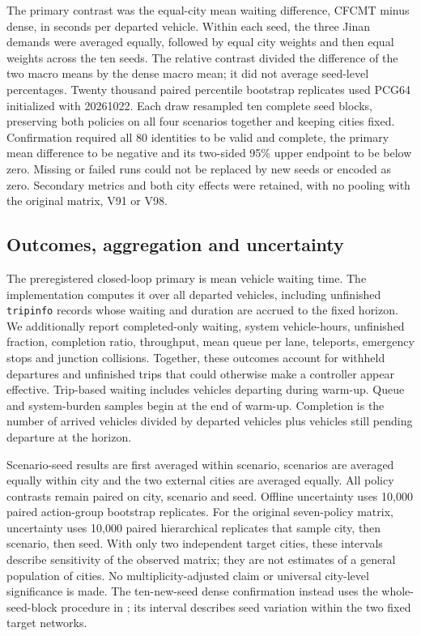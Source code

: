 The primary contrast was the equal-city mean waiting difference, CFCMT minus
dense, in seconds per departed vehicle.  Within each seed, the three Jinan
demands were averaged equally, followed by equal city weights and then equal
weights across the ten seeds.  The relative contrast divided the difference
of the two macro means by the dense macro mean; it did not average seed-level
percentages.  Twenty thousand paired percentile bootstrap replicates used
PCG64 initialized with 20261022.  Each draw resampled ten complete seed blocks,
preserving both policies on all four scenarios together and keeping cities
fixed.  Confirmation required all 80 identities to be valid and complete,
the primary mean difference to be negative and its two-sided 95\% upper
endpoint to be below zero.  Missing or failed runs could not be replaced by
new seeds or encoded as zero.  Secondary metrics and both city effects were
retained, with no pooling with the original matrix, V91 or V98.

\subsection{Outcomes, aggregation and uncertainty}

The preregistered closed-loop primary is mean vehicle waiting time.  The
implementation computes it over all departed vehicles, including unfinished
\texttt{tripinfo} records whose waiting and duration are accrued to the fixed
horizon.  We additionally report completed-only waiting, system vehicle-hours,
unfinished fraction, completion ratio, throughput, mean queue per lane,
teleports, emergency stops and junction collisions.  Together, these outcomes
account for withheld departures and unfinished trips that could otherwise
make a controller appear effective.
Trip-based waiting includes vehicles departing during warm-up.  Queue and
system-burden samples begin at the end of warm-up.  Completion is the number
of arrived vehicles divided by departed vehicles plus vehicles still pending
departure at the horizon.

Scenario-seed results are first averaged within scenario, scenarios are
averaged equally within city and the two external cities are averaged equally.
All policy contrasts remain paired on city, scenario and seed.  Offline
uncertainty uses 10,000 paired action-group bootstrap replicates.  For the
original seven-policy matrix, uncertainty uses 10,000 paired hierarchical
replicates that sample city, then
scenario, then seed.  With only two independent target cities, these intervals
describe sensitivity of the observed matrix; they are not estimates of a
general population of cities.  No multiplicity-adjusted claim or universal
city-level significance is made.
The ten-new-seed dense confirmation instead uses the whole-seed-block
procedure in ; its interval describes
seed variation within the two fixed target networks.


